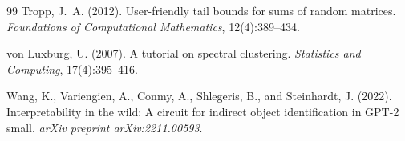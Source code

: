 \documentclass[11pt]{article}
\newcommand{\1}{\mathbbm{1}}
\begin{document}
\begin{thebibliography}{99}
Tropp, J.~A. (2012).
\newblock User-friendly tail bounds for sums of random matrices.
\newblock \emph{Foundations of Computational Mathematics}, 12(4):389--434.

von Luxburg, U. (2007).
\newblock A tutorial on spectral clustering.
\newblock \emph{Statistics and Computing}, 17(4):395--416.

Wang, K., Variengien, A., Conmy, A., Shlegeris, B., and Steinhardt, J. (2022).
\newblock Interpretability in the wild: A circuit for indirect object identification in {GPT-2} small.
\newblock \emph{arXiv preprint arXiv:2211.00593}.

\end{thebibliography}
\end{document}
